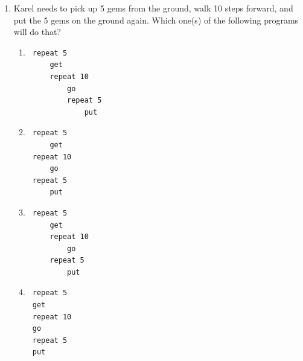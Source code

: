 \documentclass[article,A4,12pt]{llncs}
\begin{document}
\begin{enumerate}
\begin{enumerate}
\begin{verbatim}
 left
 left
 left
 left
\end{verbatim}
\item[A2] 
\begin{verbatim}
 repeat 2
     right
     right
\end{verbatim}
\item[A3] 
\begin{verbatim}
 repeat 4
     left
\end{verbatim}
\item[A4] 
\begin{verbatim}
 repeat 2
     repeat 2
         right
\end{verbatim}
\end{enumerate}
\item Karel needs to pick up 5 gems from the ground, walk 10 steps forward, and put the 5 gems 
      on the ground again. Which one(s) of the following programs will do that?
\begin{enumerate}
\item[A1] 
\begin{verbatim}
 repeat 5
     get
     repeat 10
         go
         repeat 5
             put
\end{verbatim}
\item[A2] 
\begin{verbatim}
 repeat 5
     get
 repeat 10
     go
 repeat 5
     put
\end{verbatim}
\item[A3] 
\begin{verbatim}
 repeat 5
     get
     repeat 10
         go
     repeat 5
         put
\end{verbatim}
\item[A4] 
\begin{verbatim}
 repeat 5
 get
 repeat 10
 go
 repeat 5
 put
\end{verbatim}
\end{enumerate}
\end{enumerate}

\end{document}
